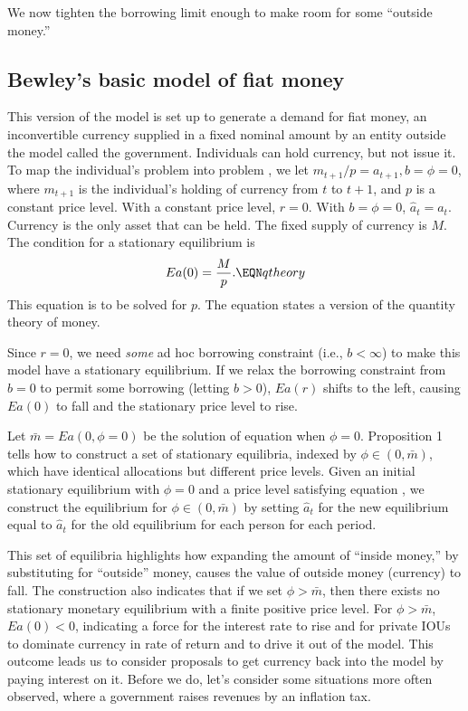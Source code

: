 We now tighten the borrowing limit enough to make
room for  some ``outside money.''

\subsection{Bewley's basic model of fiat money}
   This version of the  model is set up to generate a demand for fiat money,
an inconvertible currency  supplied in a fixed nominal
amount by  an
entity outside the model called the government.  Individuals can hold currency,
but not issue it.  To map the individual's problem into
problem ,
we let $m_{t+1} / p = a_{t+1} , b= \phi =0$, where $m_{t+1}$
is the individual's holding of currency from $t$ to $t+1$,
and $p$ is a constant price level. With a constant price
level, $r=0$.   With $b=\phi=0$,
$\hat a_t = a_t$. Currency is the only
asset that can   be held.   The fixed supply of currency is $M$.
The condition for a stationary  equilibrium
is
$$ E a(0) = { M   \over p}. \EQN qtheory  $$
This equation is to be solved for $p$.  The equation states
a version of the  quantity theory of money.

  Since $r=0$, we need {\it some\/} ad hoc borrowing constraint
(i.e., $b < \infty$)
to make this model have a stationary equilibrium.
    If we relax the borrowing constraint from $b=0$ to permit
some borrowing (letting $b > 0$),  $E a(r) $
shifts to the left, causing  $E a(0)$ to fall
and  the stationary price level to rise.

Let $ \bar m = E a(0, \phi=0)$ be the solution of equation
 when $\phi =0$.    Proposition
1 tells how to construct a set of stationary equilibria,
indexed  by $\phi \in (0, \bar m)$, which
have identical allocations but different price levels.
Given an initial stationary equilibrium with $\phi =0$ and a price
level satisfying equation , we construct the  equilibrium
for $\phi \in (0, \bar m)$ by
setting  $\hat a_t $ for the new equilibrium equal to $\hat a_t$ for
the old equilibrium for each person for each period.

       This set of equilibria
highlights how  expanding the amount
of ``inside money,'' by substituting for ``outside'' money,
causes the value of outside money (currency) to fall.
The construction also indicates that if we set $\phi > \bar m$,
then there exists no stationary monetary equilibrium with
a finite positive price level.
For $\phi > \bar m$,  $E a(0) < 0$, indicating
a force for the interest rate to rise and for
private IOUs to dominate currency in rate of return and to
drive it out of the model.
 This outcome leads us to consider proposals to get currency
back into the model by paying
interest on it.   Before we do, let's consider some situations
more often observed, where a government raises revenues
by an inflation tax.




